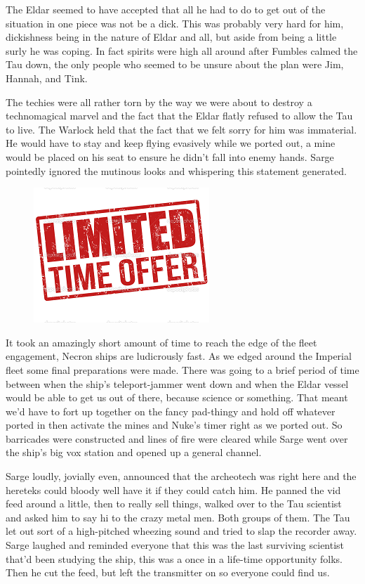 The Eldar seemed to have accepted that all he had to do to get out of the situation in one piece was not be a dick. 
This was probably very hard for him, dickishness being in the nature of Eldar and all, but aside from being a little surly he was coping. 
In fact spirits were high all around after Fumbles calmed the Tau down, the only people who seemed to be unsure about the plan were Jim, Hannah, and Tink. 


The techies were all rather torn by the way we were about to destroy a technomagical marvel and the fact that the Eldar flatly refused to allow the Tau to live. 
The Warlock held that the fact that we felt sorry for him was immaterial. 
He would have to stay and keep flying evasively while we ported out, a mine would be placed on his seat to ensure he didn't fall into enemy hands. 
Sarge pointedly ignored the mutinous looks and whispering this statement generated.

\begin{figure}
	\begin{center}
		\includegraphics[width=\figwidth]{pics/11/88.png}
	\end{center}
\end{figure}
It took an amazingly short amount of time to reach the edge of the fleet engagement, Necron ships are ludicrously fast. 
As we edged around the Imperial fleet some final preparations were made. 
There was going to a brief period of time between when the ship's teleport-jammer went down and when the Eldar vessel would be able to get us out of there, because science or something. 
That meant we'd have to fort up together on the fancy pad-thingy and hold off whatever ported in then activate the mines and Nuke's timer right as we ported out. 
So barricades were constructed and lines of fire were cleared while Sarge went over the ship's big vox station and opened up a general channel.

Sarge loudly, jovially even, announced that the archeotech was right here and the hereteks could bloody well have it if they could catch him. 
He panned the vid feed around a little, then to really sell things, walked over to the Tau scientist and asked him to say hi to the crazy metal men. 
Both groups of them. 
The Tau let out sort of a high-pitched wheezing sound and tried to slap the recorder away. 
Sarge laughed and reminded everyone that this was the last surviving scientist that'd been studying the ship, this was a once in a life-time opportunity folks. 
Then he cut the feed, but left the transmitter on so everyone could find us.

